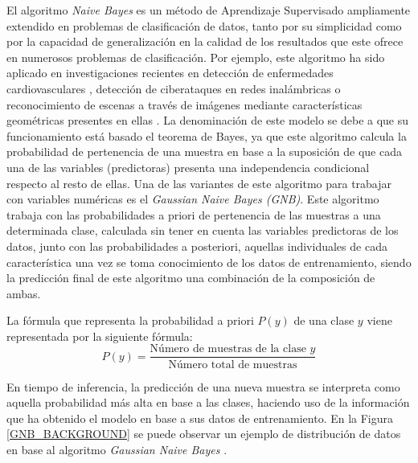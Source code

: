 El algoritmo \textit{Naive Bayes} es un método de Aprendizaje Supervisado ampliamente extendido en problemas de clasificación de datos, tanto por su simplicidad como por la capacidad de generalización en la calidad de los resultados que este ofrece en numerosos problemas de clasificación. Por ejemplo, este algoritmo ha sido aplicado en investigaciones recientes en detección de enfermedades cardiovasculares \cite{Sai_Krishna_Reddy_2022}, detección de ciberataques en redes inalámbricas \cite{9817298} o reconocimiento de escenas a través de imágenes mediante características geométricas presentes en ellas \cite{rafique2019scene}. La denominación de este modelo se debe a que su funcionamiento está basado el teorema de Bayes, ya que este algoritmo calcula la probabilidad de pertenencia de una muestra en base a la suposición de que cada una de las variables (predictoras) presenta una independencia condicional respecto al resto de ellas. Una de las variantes de este algoritmo para trabajar con variables numéricas es el \textit{Gaussian Naive Bayes (GNB)}. Este algoritmo trabaja con las probabilidades a priori de pertenencia de las muestras a una determinada clase, calculada sin tener en cuenta las variables predictoras de los datos, junto con las probabilidades a posteriori, aquellas individuales de cada característica una vez se toma conocimiento de los datos de entrenamiento, siendo la predicción final de este algoritmo una combinación de la composición de ambas.

La fórmula que representa la probabilidad a priori $P(y)$ de una clase $y$ viene representada por la siguiente fórmula:\\

\[
P(y) = \frac{\text{Número de muestras de la clase } y}{\text{Número total de muestras}}
\]



En tiempo de inferencia, la predicción de una nueva muestra se interpreta como aquella probabilidad más alta en base a las clases, haciendo uso de la información que ha obtenido el modelo en base a sus datos de entrenamiento. En la Figura \ref{GNB_BACKGROUND} se puede observar un ejemplo de distribución de datos en base al algoritmo \textit{Gaussian Naive Bayes} \cite{GNBIMAGE}.


